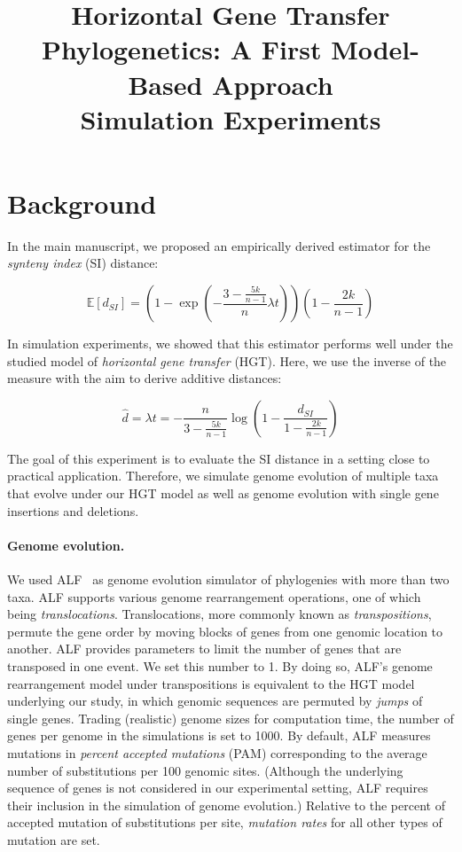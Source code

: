 \documentclass[9pt,english,utf8]{article}
\title{Horizontal Gene Transfer Phylogenetics: A First Model-Based Approach\\
Simulation Experiments}
\begin{document}
\maketitle

\section{Background}

In the main manuscript, we proposed an empirically derived estimator for the
\emph{synteny index} (SI) distance:

\begin{equation}
    \mathbb E[d_{SI}] = \left(1-\exp\left(-\frac{3-\frac{5k}{n-1}}{n} \lambda
    t\right)\right) \left(1-\frac{2k}{n-1}\right)
\end{equation}

In simulation experiments, we showed that this estimator performs well under
the studied model of \emph{horizontal gene transfer} (HGT). Here, we use the
inverse of the measure with the aim to derive additive distances:

\begin{equation}
    \hat d= \lambda t = -\frac{n}{3-\frac{5k}{n-1}}
    \log\left(1 - \frac{d_{SI}}{1-\frac{2k}{n-1}}\right)
\end{equation}

The goal of this experiment is to evaluate the SI distance in a setting close
to practical application. Therefore, we simulate genome evolution of multiple
taxa that evolve under our HGT model as well as genome evolution with single
gene insertions and deletions. 

\paragraph{Genome evolution.} We used ALF~\cite{Dalquen:2012dx} as genome
evolution simulator of phylogenies with more than two taxa. ALF supports
various genome rearrangement operations, one of which being
\emph{translocations}. Translocations, more commonly known as
\emph{transpositions}, permute the gene order by moving blocks of genes from
one genomic location to another. ALF provides parameters to limit the number of
genes that are transposed in one event. We set this number to 1. By doing so,
ALF's genome rearrangement model under transpositions is equivalent to the HGT
model underlying our study, in which genomic sequences are permuted by
\emph{jumps} of single genes. Trading (realistic) genome sizes for computation
time, the number of genes per genome in the simulations is set to 1000. By
default, ALF measures mutations in \emph{percent accepted mutations} (PAM)
corresponding to the average number of substitutions per 100 genomic sites.
(Although the underlying sequence of genes is not considered in our
experimental setting, ALF requires their inclusion in the simulation of genome
evolution.) Relative to the percent of accepted mutation of substitutions per
site, \emph{mutation rates} for all other types of mutation are set. 
\end{document}
